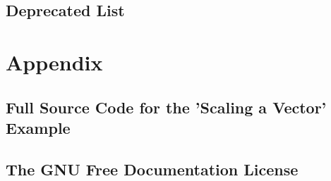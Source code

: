 

















































\chapter{Deprecated List}
\label{deprecated}
\hypertarget{deprecated}{}


\part{Appendix}

\chapter{Full Source Code for the ’Scaling a Vector’ Example}
\label{FullSourceCodeVectorScal}
\hypertarget{FullSourceCodeVectorScal}{}


\chapter{The GNU Free Documentation License}
\label{GNUFreeDocumentationLicense}
\hypertarget{GNUFreeDocumentationLicense}{}


\printindex


